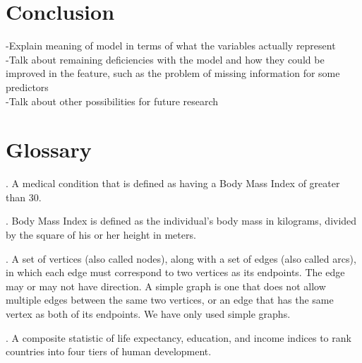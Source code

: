 \documentclass[oneside,12pt]{report}
\begin{document}
\chapter{Conclusion}

-Explain meaning of model in terms of what the variables actually represent
\\
-Talk about remaining deficiencies with the model and how they could be improved in the feature, such as the problem of missing information for some predictors
\\
-Talk about other possibilities for future research


\appendix
{}


\chapter{Glossary}\label{Glossary}

\vspace{12pt}

\vspace{8pt}
. A medical condition that is defined as having a Body Mass Index of greater than 30.

\vspace{8pt}
. Body Mass Index is defined as the individual's body mass in kilograms, divided by the square of his or her height in meters.

\vspace{8pt}
. A set of vertices (also called nodes), along with a set of edges (also called arcs), in which each edge must correspond to two vertices as its endpoints. The edge may or may not have direction. A simple graph is one that does not allow multiple edges between the same two vertices, or an edge that has the same vertex as both of its endpoints. We have only used simple graphs.

\vspace{8pt}
. A composite statistic of life expectancy, education, and income indices to rank countries into four tiers of human development.
\end{document}
